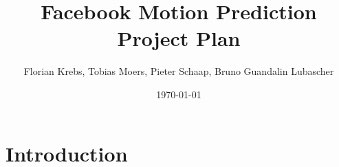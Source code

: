 \documentclass[10pt,a4paper]{article}
\title{{\Huge Facebook Motion Prediction}\\{\Large Project Plan}}
\author{Florian Krebs, Tobias Moers, Pieter Schaap, Bruno Guandalin Lubascher}
\date{\today}
\begin{document}
	
	\maketitle
	
\begin{abstract}
\end{abstract}

\newpage
\tableofcontents
\newpage


\section{Introduction}

 
\end{document}
